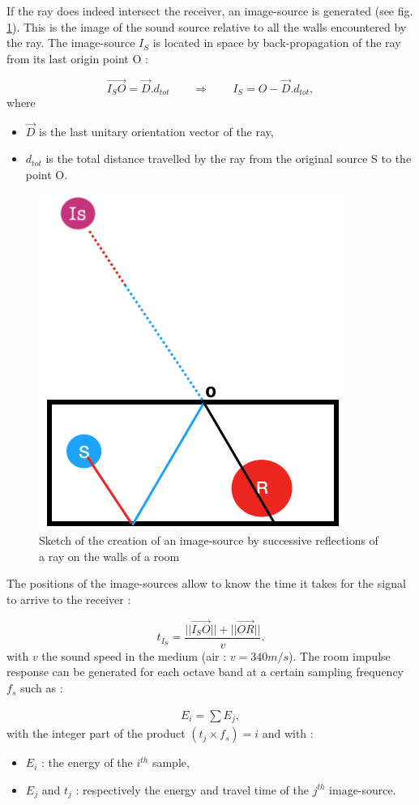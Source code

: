 \documentclass[AMA,STIX1COL]{WileyNJD-v2}
\begin{document}
If the ray does indeed intersect the receiver, an image-source is generated (see fig. \ref{schema_SI}). This is the image of the sound source relative to all the walls encountered by the ray. The image-source $I_S$ is located in space by back-propagation of the ray from its last origin point O :

\begin{equation}
\overrightarrow{I_S O} = \overrightarrow{D}.d_{tot} \qquad \Rightarrow \qquad I_S = O - \overrightarrow{D}.d_{tot},
\end{equation}
where 
\begin{itemize}
\item $\overrightarrow{D}$ is the last unitary orientation vector of the ray,
\item $d_{tot}$ is the total distance travelled by the ray from the original source S to the point O.
\end{itemize}

\begin{figure}
\centering
	\includegraphics[width=0.3\linewidth]{schema_SI}
	\caption{Sketch of the creation of an image-source by successive reflections of a ray on the walls of a room}
	\label{schema_SI}
\end{figure}

The positions of the image-sources allow to know the time it takes for the signal to arrive to the receiver :

\begin{equation}
t_{I_S} = \frac{||\overrightarrow{I_S O}|| + ||\overrightarrow{OR}||}{v}.
\end{equation}
with $v$ the sound speed in the medium (air : $v=340m/s$). The room impulse response can be generated for each octave band at a certain sampling frequency $f_s$ such as :

\begin{align}
E_{i} =  \sum{E_j},
\end{align}
with the integer part of the product $(t_j \times f_s) = i$ and with : 
\begin{itemize}
\item$E_{i}$ : the energy of the $i^{th}$ sample,
\item$E_j$ and $t_j$ : respectively the energy and travel time of the $j^{th}$ image-source.
\end{itemize}
\end{document}
